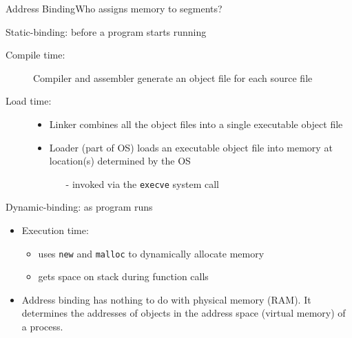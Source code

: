 \begin{frame}{Address Binding}{Who assigns memory to segments?}
  \begin{block}{Static-binding: before a program starts running}
    \begin{description}
    \item[Compile time:] \alert{Compiler} and \alert{assembler} generate an object file for
      each source file
    \item[Load time:] \hfill
      \begin{itemize}
      \item \alert{Linker} combines all the object files into a single executable object
        file
      \item \alert{Loader} (part of OS) loads an executable object file into
        memory at location(s) determined by the OS
        \begin{itemize}
        \item[-] invoked via the \texttt{execve} system call
        \end{itemize}
      \end{itemize}
    \end{description}
  \end{block}
  \begin{block}{Dynamic-binding: as program runs}
    \begin{itemize}
    \item Execution time:
      \begin{itemize}
      \item uses \texttt{new} and \texttt{malloc} to dynamically allocate memory
      \item gets space on stack during function calls
      \end{itemize}
    \end{itemize}
  \end{block}
\end{frame}

\begin{itemize}
\item Address binding has nothing to do with physical memory (RAM). It determines the
  addresses of objects in the address space (virtual memory) of a process.
\end{itemize}

